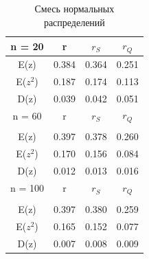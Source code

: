 \documentclass[a4]{article}
\begin{document}
		\begin{table}[h!]
			
			\caption{Смесь нормальных распределений}
			\label{tab:my_label}
			\begin{center}
				\vspace{5mm}
				\begin{tabular}{|c|c|c|c}
					\hline
					n = 20 & r & $r_S$ & $r_Q$ \\
					\hline
					E(z) & 0.384 & 0.364 & 0.251\\
					\hline
					E($z^2$)   & 0.187 & 0.174 & 0.113\\
					\hline
					D(z)   & 0.039 & 0.042 & 0.051 \\
					\hline
					n = 60 & r & $r_S$ & $r_Q$ \\
					\hline\\
					\hline
					E(z) & 0.397 & 0.378 & 0.260\\
					\hline
					E($z^2$)   & 0.170 & 0.156 & 0.084\\
					\hline
					D(z)   & 0.012 & 0.013 & 0.016 \\
					\hline
					n = 100 & r & $r_S$ & $r_Q$ \\
					\hline\\
					\hline
					E(z) & 0.397 & 0.380 & 0.259\\
					\hline
					E($z^2$)   & 0.165 & 0.152 & 0.077\\
					\hline
					D(z)   & 0.007 & 0.008 & 0.009 \\
					\hline
				\end{tabular}
				
			\end{center}
			
		\end{table}
	\newpage
\end{document}
